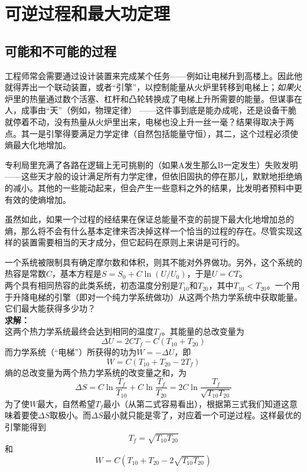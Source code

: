 
\chapter{可逆过程和最大功定理}\label{chap4}

\section{可能和不可能的过程}\label{sec4.1}

工程师常会需要通过设计装置来完成某个任务——例如让电梯升到高楼上。因此他就得弄出一个联动装置，或者“引擎”，以控制能量从火炉里转移到电梯上；{\it 如果}火炉里的热量通过数个活塞、杠杆和凸轮转换成了电梯上升所需要的能量。但谋事在人，成事由“天”（例如，物理定律）%
%
——这件事到底是能办成呢，还是设备干脆就停着不动，没有热量从火炉里出来，电梯也没上升一丝一毫？结果得取决于两点。其一是引擎得要满足力学定律（自然包括能量守恒），其二，这个过程必须使熵最大化地增加。

专利局里充满了各路在逻辑上无可挑剔的（如果A发生那么B一定发生）失败发明——这些天才般的设计满足所有力学定律，但依旧固执的停在那儿，默默地拒绝熵的减小。其他的一些能动起来，但会产生一些意料之外的结果，比发明者预料中更有效的使熵增加。

虽然如此，如果一个过程的经结果在保证总能量不变的前提下最大化地增加总的熵，那么将不会有什么基本定律来否决掉这样一个恰当的过程的存在。尽管实现这样的装置需要相当的天才成分，但它起码在原则上来讲是可行的。

\begin{example}\label{eg4.1}
一个系统被限制具有确定摩尔数和体积，则其不能对外界做功。另外，这个系统的热容是常数$C$，基本方程是$S=S_0+C\ln(U/U_0)$，于是$U=CT$。\\
两个具有相同热容的此类系统，初态温度分别是$T_{10}$和$T_{20}$，其中$T_{10}<T_{20}$。一个用于升降电梯的引擎（即对一个纯力学系统做功）从这两个热力学系统中获取能量。它们最大能获得多少功？\\
{\bf 求解：}\\
这两个热力学系统最终会达到相同的温度$T_f$。其能量的总改变量为
\[
\Delta U = 2CT_f-C(T_{10}+T_{20})
\]
而力学系统（“电梯”）所获得的功为$W=-\Delta U$，即
\[
W = C(T_{10}+T_{20}-2T_f)
\]
熵的总改变量为两个热力学系统的改变量之和，为
\[
\Delta S = C\ln\frac{T_f}{T_{10}} + C\ln\frac{T_f}{T_{20}} = 2C\ln\frac{T_f}{\sqrt{T_{10}T_{20}}}
\]
为了使$W$最大，自然希望$T_f$最小（从第二式容易看出），根据第三式我们知道这意味着要使$\Delta S$取极小。而$\Delta S$最小就只能是零了，对应着一个可逆过程。这样最优的引擎能得到
\[
T_f = \sqrt{T_{10}T_{20}}
\]
和
\[
W = C(T_{10}+T_{20}-2\sqrt{T_{10}T_{20}})
\]
\end{example}

